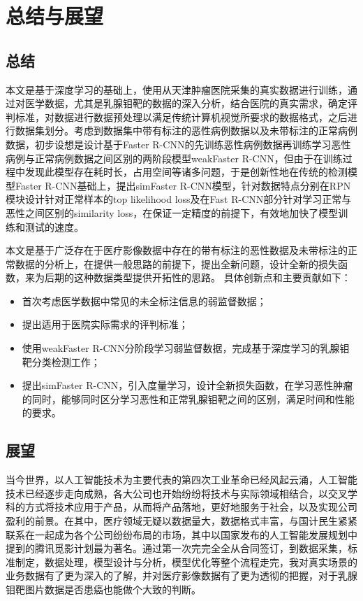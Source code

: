 \chapter{总结与展望}\label{chap:future}

\section{总结}
本文是基于深度学习的基础上，使用从天津肿瘤医院采集的真实数据进行训练，通过对医学数据，尤其是乳腺钼靶的数据的深入分析，结合医院的真实需求，确定评判标准，对数据进行数据预处理以满足传统计算机视觉所要求的数据格式，之后进行数据集划分。考虑到数据集中带有标注的恶性病例数据以及未带标注的正常病例数据，初步设想是设计基于Faster R-CNN的先训练恶性病例数据再训练学习恶性病例与正常病例数据之间区别的两阶段模型weakFaster R-CNN，但由于在训练过程中发现此模型存在耗时长，占用空间等诸多问题，于是创新性地在传统的检测模型Faster R-CNN基础上，提出simFaster R-CNN模型，针对数据特点分别在RPN模块设计针对正常样本的top likelihood loss及在Fast R-CNN部分针对学习正常与恶性之间区别的similarity loss，在保证一定精度的前提下，有效地加快了模型训练和测试的速度。

本文是基于广泛存在于医疗影像数据中存在的带有标注的恶性数据及未带标注的正常数据的分析上，在提供一般思路的前提下，提出全新问题，设计全新的损失函数，来为后期的这种数据类型提供开拓性的思路。 
具体创新点和主要贡献如下：
\begin{itemize}
	\item 首次考虑医学数据中常见的未全标注信息的弱监督数据； 
	\item 提出适用于医院实际需求的评判标准；
	\item 使用weakFaster R-CNN分阶段学习弱监督数据，完成基于深度学习的乳腺钼靶分类检测工作； 
	\item 提出simFaster R-CNN，引入度量学习，设计全新损失函数，在学习恶性肿瘤的同时，能够同时区分学习恶性和正常乳腺钼靶之间的区别，满足时间和性能的要求。
\end{itemize}

\section{展望}
当今世界，以人工智能技术为主要代表的第四次工业革命已经风起云涌，人工智能技术已经逐步走向成熟，各大公司也开始纷纷将技术与实际领域相结合，以交叉学科的方式将技术应用于产品，从而将产品落地，更好地服务于社会，以及实现公司盈利的前景。在其中，医疗领域无疑以数据量大，数据格式丰富，与国计民生紧紧联系在一起成为各个公司纷纷布局的市场，其中以国家发布的人工智能发展规划中提到的腾讯觅影计划最为著名。通过第一次完完全全从合同签订，到数据采集，标准制定，数据处理，模型设计与分析，模型优化等整个流程走完，我对真实场景的业务数据有了更为深入的了解，并对医疗影像数据有了更为透彻的把握，对于乳腺钼靶图片数据是否患癌也能做个大致的判断。

